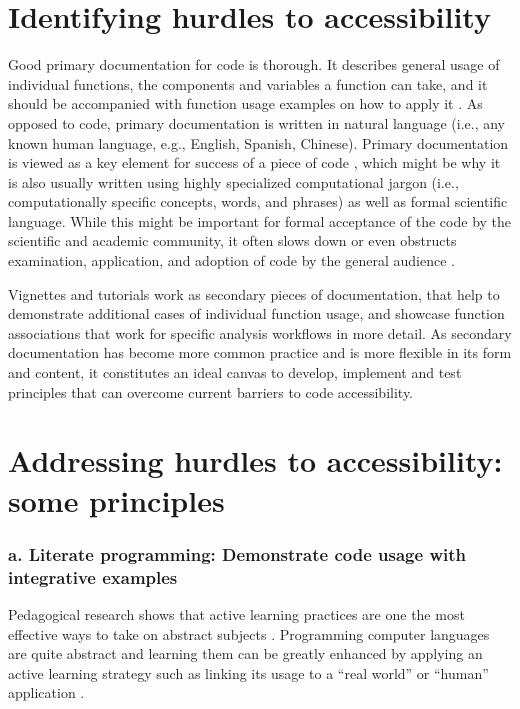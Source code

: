 \documentclass[12pt]{article}
\begin{document}
\section*{Identifying hurdles to accessibility}
\label{sec:identifying}

Good primary documentation for code is thorough. It describes general usage of individual functions,
the components and variables a function can take, and it should be accompanied with
function usage examples on how to apply it \citep{karimzadeh2018top}.
As opposed to code, primary documentation is written in natural language (i.e.,
any known human language, e.g., English, Spanish, Chinese).
Primary documentation is viewed as a key element for success of a piece of code
\citep{karimzadeh2018top},
which might be why it is also usually written using highly specialized computational jargon (i.e., computationally specific concepts,
words, and phrases) as well as formal scientific language.
While this might be important for formal acceptance of the code by the scientific
and academic community, it often slows down or even
obstructs examination, application, and adoption of code by the general audience \citep{ball2017its}.

Vignettes and tutorials work as secondary pieces of documentation, that help to demonstrate
additional cases of individual function usage, and showcase function associations
that work for specific analysis workflows in more detail.
As secondary documentation has become more common practice and is more flexible
in its form and content, it constitutes an ideal canvas to develop, implement and
test principles that can overcome current barriers to code accessibility.

\section*{Addressing hurdles to accessibility: some principles}
\label{sec:addressing}

\subsubsection*{a. Literate programming: Demonstrate code usage with integrative examples}

Pedagogical research shows that active learning practices are one the most effective
ways to take on abstract subjects \citep{freeman2014active}.
Programming computer languages are quite abstract and learning them can be greatly
enhanced by applying an active learning strategy such as linking its usage to
a ``real world'' or ``human'' application \citep{felder2009active}.
\end{document}
